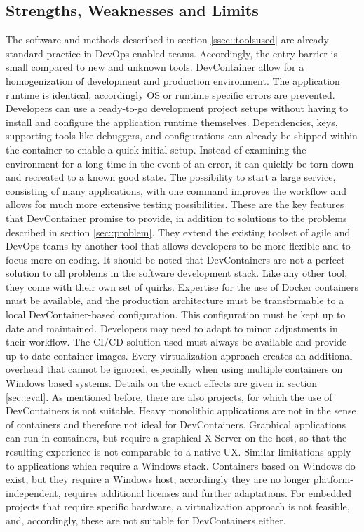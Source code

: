     \subsection{Strengths, Weaknesses and Limits}\label{ssec::limits}
    The software and methods described in section \ref{ssec::toolsused} are already standard practice in DevOps enabled teams. Accordingly, the entry barrier is small compared to new and unknown tools. DevContainer allow for a homogenization of development and production environment. The application runtime is identical, accordingly \ac{OS} or runtime specific errors are prevented. Developers can use a ready-to-go development project setups without having to install and configure the application runtime themselves. Dependencies, keys, supporting tools like debuggers, and configurations can already be shipped within the container to enable a quick initial setup. Instead of examining the environment for a long time in the event of an error, it can quickly be torn down and recreated to a known good state. The possibility to start a large service, consisting of many applications, with one command improves the workflow and allows for much more extensive testing possibilities. These are the key features that DevContainer promise to provide, in addition to solutions to the problems described in section \ref{sec::problem}. They extend the existing toolset of agile and DevOps teams by another tool that allows developers to be more flexible and to focus more on coding.\newline %
    It should be noted that DevContainers are not a perfect solution to all problems in the software development stack. Like any other tool, they come with their own set of quirks. Expertise for the use of Docker containers must be available, and the production architecture must be transformable to a local DevContainer-based configuration. This configuration must be kept up to date and maintained. Developers may need to adapt to minor adjustments in their workflow. The \ac{CI}/\ac{CD} solution used must always be available and provide up-to-date container images. Every virtualization approach creates an additional overhead that cannot be ignored, especially when using multiple containers on Windows based systems. Details on the exact effects are given in section \ref{sec::eval}.\newline
    As mentioned before, there are also projects, for which the use of DevContainers is not suitable. Heavy monolithic applications are not in the sense of containers and therefore not ideal for DevContainers. Graphical applications can run in containers, but require a graphical X-Server on the host, so that the resulting experience is not comparable to a native \ac{UX}. Similar limitations apply to applications which require a Windows stack. Containers based on Windows do exist, but they require a Windows host, accordingly they are no longer platform-independent, requires additional licenses and further adaptations. For embedded projects that require specific hardware, a virtualization approach is not feasible, and, accordingly, these are not suitable for DevContainers either.\newline
